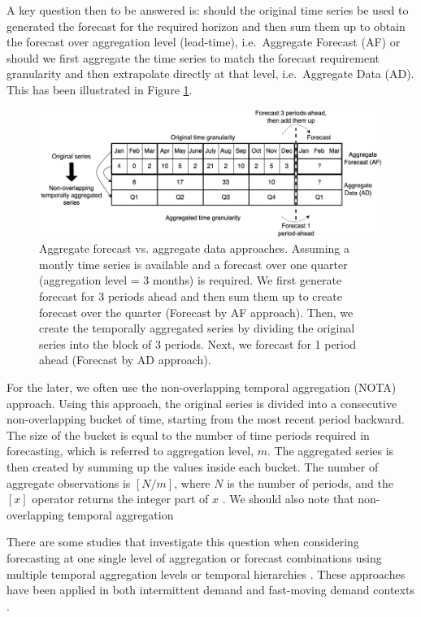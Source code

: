 \documentclass[]{elsarticle} %
\begin{document}
A key question then to be answered is: should the original time series
be used to generated the forecast for the required horizon and then sum
them up to obtain the forecast over aggregation level (lead-time),
i.e.~Aggregate Forecast (AF) or should we first aggregate the time
series to match the forecast requirement granularity and then
extrapolate directly at that level, i.e.~Aggregate Data (AD). This has
been illustrated in Figure \ref{fig:example_oanoa}.

\begin{figure}[H]
\includegraphics[width=0.9\linewidth]{img/300dpi/nota} \caption{Aggregate forecast vs. aggregate data approaches. Assuming a montly time series is available and a forecast over one quarter (aggregation level = 3 months) is required. We first generate forecast for 3 periods ahead and then sum them up to create forecast over the quarter (Forecast by AF approach). Then, we create the temporally aggregated series by dividing the original series into the block of 3 periods. Next, we forecast for 1 period ahead (Forecast by AD approach).}\label{fig:example_oanoa}
\end{figure}

For the later, we often use the non-overlapping temporal aggregation
(NOTA) approach. Using this approach, the original series is divided
into a consecutive non-overlapping bucket of time, starting from the
most recent period backward. The size of the bucket is equal to the
number of time periods required in forecasting, which is referred to
aggregation level, \(m\). The aggregated series is then created by
summing up the values inside each bucket. The number of aggregate
observations is \([N/m]\), where \(N\) is the number of periods, and the
\([x]\) operator returns the integer part of \(x\)
\citep{rostami2019impact}. We should also note that non-overlapping
temporal aggregation

There are some studies that investigate this question when considering
forecasting at one single level of aggregation
\citep[\citet{rostami2014note},
\citet{kourentzes2017demand}]{rostami2013demand} or forecast
combinations using multiple temporal aggregation levels
\citep{kourentzes2014improving} or temporal hierarchies
\citep{athanasopoulos2017forecasting}. These approaches have been
applied
\citep[\citet{petropoulos2014forecast}]{nikolopoulos2011aggregate} in
both intermittent demand \citep{nikolopoulos2021we} and fast-moving
demand contexts \citep{athanasopoulos2017forecasting}.
\end{document}
